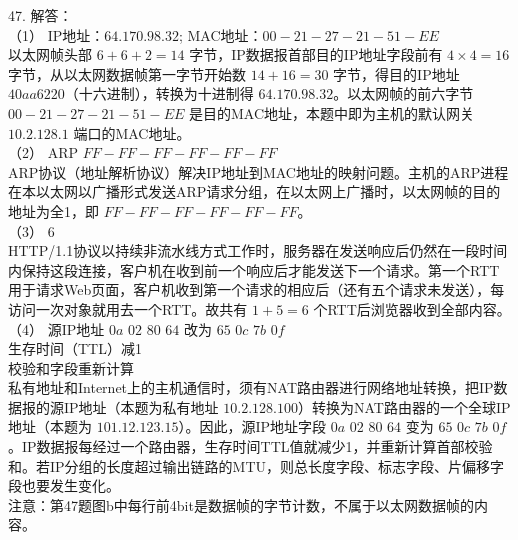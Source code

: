 47. 解答： \\
（1） IP地址：$64.170.98.32$; MAC地址：$00-21-27-21-51-EE$ \\
以太网帧头部 $6+6+2=14$ 字节，IP数据报首部目的IP地址字段前有 $4\times4=16$ 字节，从以太网数据帧第一字节开始数 $14+16=30$ 字节，得目的IP地址 $40 aa 62 20$（十六进制），转换为十进制得 $64.170.98.32$。以太网帧的前六字节 $00-21-27-21-51-EE$ 是目的MAC地址，本题中即为主机的默认网关 $10.2.128.1$ 端口的MAC地址。 \\
（2） ARP  $FF-FF-FF-FF-FF-FF$ \\
ARP协议（地址解析协议）解决IP地址到MAC地址的映射问题。主机的ARP进程在本以太网以广播形式发送ARP请求分组，在以太网上广播时，以太网帧的目的地址为全1，即 $FF-FF-FF-FF-FF-FF$。 \\
（3） 6 \\
HTTP/1.1协议以持续非流水线方式工作时，服务器在发送响应后仍然在一段时间内保持这段连接，客户机在收到前一个响应后才能发送下一个请求。第一个RTT用于请求Web页面，客户机收到第一个请求的相应后（还有五个请求未发送），每访问一次对象就用去一个RTT。故共有 $1+5=6$ 个RTT后浏览器收到全部内容。 \\
（4） 源IP地址 $0a$ $02$ $80$ $64$ 改为 $65$ $0c$ $7b$ $0f$ \\
生存时间（TTL）减1 \\
校验和字段重新计算 \\
私有地址和Internet上的主机通信时，须有NAT路由器进行网络地址转换，把IP数据报的源IP地址（本题为私有地址 $10.2.128.100$）转换为NAT路由器的一个全球IP地址（本题为 $101.12.123.15$）。因此，源IP地址字段 $0a$ $02$ $80$ $64$ 变为 $65$ $0c$ $7b$ $0f$。IP数据报每经过一个路由器，生存时间TTL值就减少1，并重新计算首部校验和。若IP分组的长度超过输出链路的MTU，则总长度字段、标志字段、片偏移字段也要发生变化。 \\
注意：第47题图b中每行前4bit是数据帧的字节计数，不属于以太网数据帧的内容。